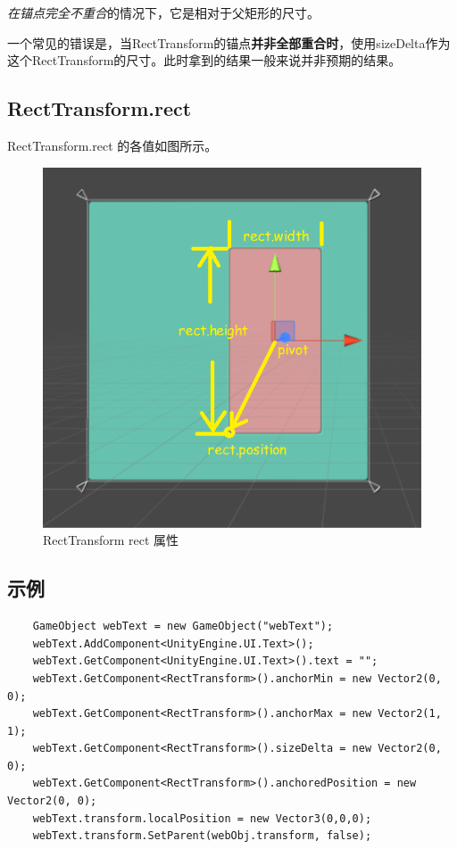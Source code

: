 \documentclass[UTF8,a4paper,12pt]{ctexbook}
\begin{document}
			\textit{在锚点完全不重合}的情况下，它是相对于父矩形的尺寸。
			
			一个常见的错误是，当RectTransform的锚点\textbf{并非全部重合时}，使用sizeDelta作为这个RectTransform的尺寸。此时拿到的结果一般来说并非预期的结果。
			
		\subsection{RectTransform.rect}	
			RectTransform.rect 的各值如图所示。
			
			\begin{figure}[H]
				\centering
				\includegraphics[scale=0.8]{RectTransform-rect.png}
				\caption{RectTransform rect 属性}
			\end{figure}	
		
		\subsection{示例}
			\begin{lstlisting}
	GameObject webText = new GameObject("webText");
	webText.AddComponent<UnityEngine.UI.Text>();
	webText.GetComponent<UnityEngine.UI.Text>().text = "";
	webText.GetComponent<RectTransform>().anchorMin = new Vector2(0, 0);
	webText.GetComponent<RectTransform>().anchorMax = new Vector2(1, 1);
	webText.GetComponent<RectTransform>().sizeDelta = new Vector2(0, 0);
	webText.GetComponent<RectTransform>().anchoredPosition = new Vector2(0, 0);
	webText.transform.localPosition = new Vector3(0,0,0);
	webText.transform.SetParent(webObj.transform, false);
			\end{lstlisting}
			
\end{document}
